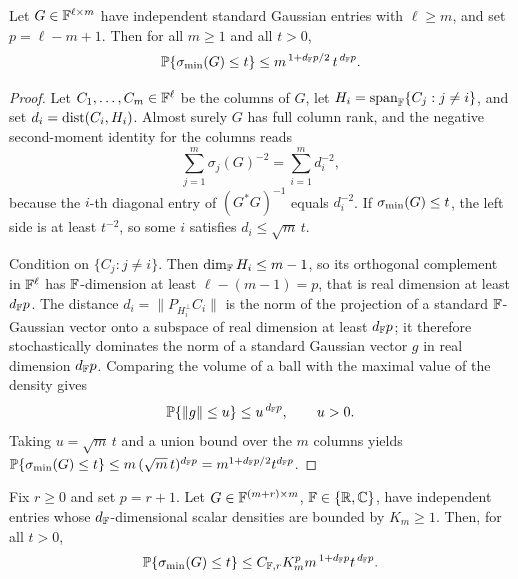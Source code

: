 \begin{lemma}\label{rect:tall-tail}
Let \(G\in\mathbb{F}^{\ell\times m}\) have independent standard Gaussian entries with
\(\ell\ge m\), and set \(p=\ell-m+1\).  Then for all \(m\ge1\) and all \(t>0\),
\[
  \mathbb{P}\{\sigma_{\min}(G)\le t\}\le m^{\,1+d_{\mathbb{F}} p/2}\,t^{\,d_{\mathbb{F}} p}.
\]
\end{lemma}

\begin{proof}
Let \(C_1,\dots,C_m\in\mathbb{F}^{\ell}\) be the columns of \(G\), let
\(H_i=\operatorname{span}_{\mathbb{F}}\{C_j:j\ne i\}\), and set \(d_i=\operatorname{dist}(C_i,H_i)\).  Almost surely
\(G\) has full column rank, and the negative second-moment identity for the
columns reads
\[
  \sum_{j=1}^m \sigma_j(G)^{-2}=\sum_{i=1}^m d_i^{-2},
\]
because the \(i\)-th diagonal entry of \((G^*G)^{-1}\) equals \(d_i^{-2}\).  If
\(\sigma_{\min}(G)\le t\), the left side is at least \(t^{-2}\), so some \(i\) satisfies
\(d_i\le\sqrt m\,t\).

Condition on \(\{C_j:j\ne i\}\).  Then \(\dim_{\mathbb{F}} H_i\le m-1\), so its orthogonal
complement in \(\mathbb{F}^{\ell}\) has \(\mathbb{F}\)-dimension at least \(\ell-(m-1)=p\), that
is real dimension at least \(d_{\mathbb{F}} p\).  The distance \(d_i=\|P_{H_i^\perp}C_i\|\)
is the norm of the projection of a standard \(\mathbb{F}\)-Gaussian vector onto a
subspace of real dimension at least \(d_{\mathbb{F}} p\); it therefore stochastically
dominates the norm of a standard Gaussian vector \(g\) in real dimension
\(d_{\mathbb{F}} p\).  Comparing the volume of a ball with the maximal value of the density
gives
\[
  \mathbb{P}\{\|g\|\le u\}\le u^{\,d_{\mathbb{F}} p},\qquad u>0.
\]
Taking \(u=\sqrt m\,t\) and a union bound over the \(m\) columns yields
\(\mathbb{P}\{\sigma_{\min}(G)\le t\}\le m\,(\sqrt m\,t)^{d_{\mathbb{F}} p}=m^{1+d_{\mathbb{F}} p/2}t^{d_{\mathbb{F}} p}\).
\end{proof}

\begin{lemma}\label{rect:bd-tail}
Fix \(r\ge0\) and set \(p=r+1\).  Let
\(G\in\mathbb{F}^{(m+r)\times m}\), \(\mathbb{F}\in\{\mathbb{R},\mathbb{C}\}\), have independent entries whose
\(d_{\mathbb{F}}\)-dimensional scalar densities are bounded by \(K_m\ge1\).  Then, for all
\(t>0\),
\[
  \mathbb{P}\{\sigma_{\min}(G)\le t\}
  \le C_{\mathbb{F},r}K_m^{p}m^{\,1+d_{\mathbb{F}} p}t^{\,d_{\mathbb{F}} p}.
\]
\end{lemma}


